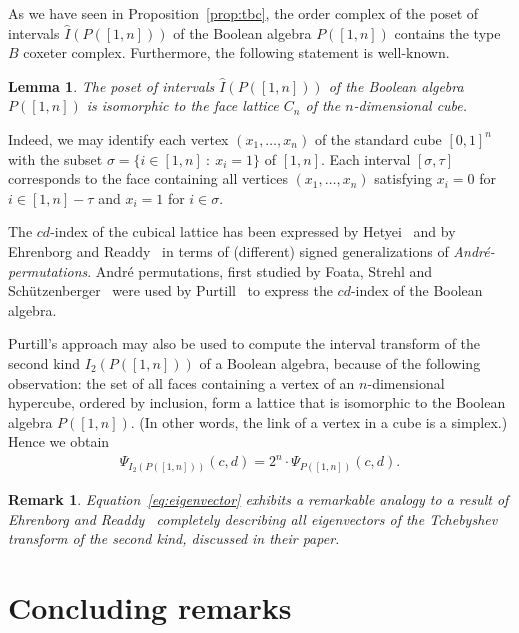 \documentclass[reqno,12pt]{amsart}
\numberwithin{equation}{section}
\newtheorem{lemma}[theorem]{Lemma}
\newtheorem{remark}[theorem]{Remark}
\newcommand{\0}{\widehat{0}}
\newcommand{\1}{\widehat{1}}
\newcommand{\2}{\widehat{2}}
\newcommand{\grI}{\widehat{I}}
\newcommand{\II}{I_2}
\begin{document}
As we have seen in Proposition~\ref{prop:tbc}, the order complex of the
poset of intervals $\grI(P([1,n]))$ of the Boolean algebra $P([1,n])$
contains the type $B$ coxeter complex. Furthermore, the following
statement is well-known.

\begin{lemma}
The poset of intervals $\grI(P([1,n]))$ of the Boolean algebra $P([1,n])$
is isomorphic to the face lattice $C_n$ of the $n$-dimensional cube. 
\end{lemma}  
Indeed, we may identify each vertex $(x_1,\ldots,x_n)$ of the standard
cube $[0,1]^n$ with the subset $\sigma=\{i\in [1,n]\::\: x_i=1\}$ of
$[1,n]$. Each interval $[\sigma,\tau]$ corresponds to the face containing
all vertices $(x_1,\ldots,x_n)$ satisfying $x_i=0$ for $i\in [1,n]-\tau$
and $x_i=1$ for $i\in \sigma$.

The $cd$-index of the cubical lattice has been expressed by
Hetyei~\cite{Hetyei-andre} and by Ehrenborg and
Readdy~\cite{Ehrenborg-Readdy-rcubical} in terms of (different) signed
generalizations of {\em Andr\'e-permutations}. Andr\'e permutations,
first studied by Foata, Strehl and
Sch\"utzenberger~\cite{Foata-Schutzenberger,Foata-Strehl} were used by
Purtill~\cite{Purtill} to express the $cd$-index of the Boolean
algebra.

Purtill's approach may also be used to compute the interval transform of
the second kind $\II(P([1,n]))$ of a Boolean algebra, because of the
following observation: the set of all faces containing a vertex of an
$n$-dimensional hypercube, ordered by inclusion, form a lattice that is
isomorphic to the Boolean algebra $P([1,n])$. (In other words, the link
of a vertex in a cube is a simplex.) Hence we obtain
\begin{align}
\label{eq:eigenvector}  
\Psi_{\II(P([1,n]))}(c,d)=2^n\cdot \Psi_{P([1,n])}(c,d). 
\end{align}  

\begin{remark}
Equation~\ref{eq:eigenvector} exhibits a remarkable analogy to a result
of Ehrenborg and Readdy~\cite[Theorem 10.10]{Ehrenborg-Readdy-Tch}
completely describing all eigenvectors of the Tchebyshev transform of
the second kind, discussed in their paper. 
\end{remark}  


\section{Concluding remarks}
\end{document}
